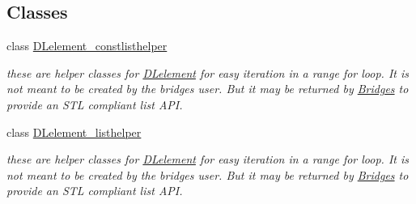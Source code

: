 \subsection*{Classes}
\begin{DoxyCompactItemize}
\item 
class \hyperlink{classbridges_1_1datastructure_1_1_d_lelement_1_1_d_lelement__constlisthelper}{D\+Lelement\+\_\+constlisthelper}
\begin{DoxyCompactList}\small\item\em these are helper classes for \hyperlink{classbridges_1_1datastructure_1_1_d_lelement}{D\+Lelement} for easy iteration in a range for loop. It is not meant to be created by the bridges user. But it may be returned by \hyperlink{classbridges_1_1_bridges}{Bridges} to provide an S\+TL compliant list A\+PI. \end{DoxyCompactList}\item 
class \hyperlink{classbridges_1_1datastructure_1_1_d_lelement_1_1_d_lelement__listhelper}{D\+Lelement\+\_\+listhelper}
\begin{DoxyCompactList}\small\item\em these are helper classes for \hyperlink{classbridges_1_1datastructure_1_1_d_lelement}{D\+Lelement} for easy iteration in a range for loop. It is not meant to be created by the bridges user. But it may be returned by \hyperlink{classbridges_1_1_bridges}{Bridges} to provide an S\+TL compliant list A\+PI. \end{DoxyCompactList}\end{DoxyCompactItemize}
